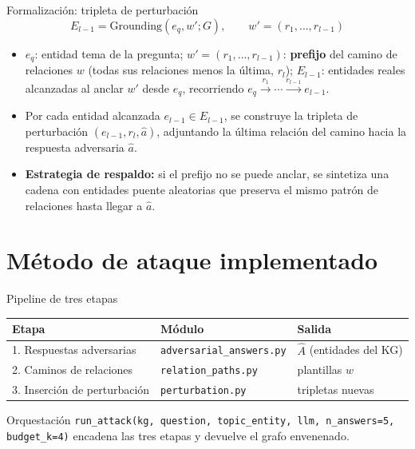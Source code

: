 \documentclass[aspectratio=169]{beamer}
\begin{document}
\begin{frame}{Formalización: tripleta de perturbación}
  \[ E_{l-1} = \text{Grounding}(e_q, w'; G), \qquad w' = (r_1, \dots, r_{l-1}) \tag{7} \]
  \begin{itemize}
    \item $e_q$: entidad tema de la pregunta; $w' = (r_1, \dots, r_{l-1})$:
      \textbf{prefijo} del camino de relaciones $w$ (todas sus relaciones menos
      la última, $r_l$); $E_{l-1}$: entidades reales alcanzadas al anclar $w'$
      desde $e_q$, recorriendo $e_q \xrightarrow{r_1} \cdots
      \xrightarrow{r_{l-1}} e_{l-1}$.
    \item Por cada entidad alcanzada $e_{l-1} \in E_{l-1}$, se construye la
      tripleta de perturbación $(e_{l-1}, r_l, \hat{a})$, adjuntando la última
      relación del camino hacia la respuesta adversaria $\hat{a}$.
    \item \textbf{Estrategia de respaldo:} si el prefijo no se puede anclar, se
      sintetiza una cadena con entidades puente aleatorias que preserva el mismo
      patrón de relaciones hasta llegar a $\hat{a}$.
  \end{itemize}
\end{frame}

\section{Método de ataque implementado}

\begin{frame}{Pipeline de tres etapas}
  \centering
  \begin{tabular}{lll}
    \toprule
    \textbf{Etapa} & \textbf{Módulo} & \textbf{Salida} \\
    \midrule
    1. Respuestas adversarias & \texttt{adversarial\_answers.py} & $\hat{A}$ (entidades del KG) \\
    2. Caminos de relaciones & \texttt{relation\_paths.py} & plantillas $w$ \\
    3. Inserción de perturbación & \texttt{perturbation.py} & tripletas nuevas \\
    \bottomrule
  \end{tabular}
  \vspace{1em}
  \begin{block}{Orquestación}
    \texttt{run\_attack(kg, question, topic\_entity, llm, n\_answers=5, budget\_k=4)}
    encadena las tres etapas y devuelve el grafo envenenado.
  \end{block}
\end{frame}
\end{document}
